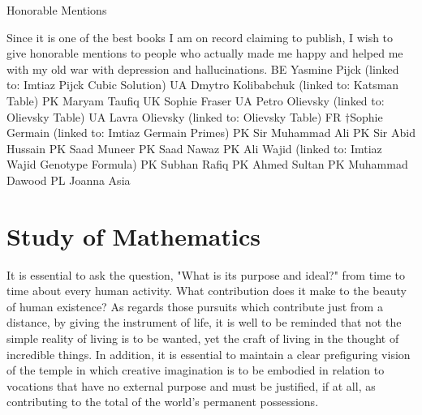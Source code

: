 \documentclass[a4paper,12pt]{book}[2004/02/16]
\providecommand{\hypertarget}[2]{#2}
\theoremstyle{ilemma}
\theoremstyle{itheorem}
\theoremstyle{iother}
\theoremstyle{icorollary}
\theoremstyle{numcorollary}
\theoremstyle{idefinition}
\begin{document}
\newpage
\Huge
\begin{center}
Honorable Mentions  
\end{center}
\normalsize
Since it is one of the best books I am on record claiming to publish, I wish to give honorable mentions to people who actually made me happy and helped me with my old war with depression and hallucinations.
\newline
\newline
BE Yasmine Pijck  (linked to: Imtiaz Pijck Cubic Solution)
\newline
UA Dmytro Kolibabchuk (linked to: Katsman Table)
\newline
PK Maryam Taufiq
\newline
UK Sophie Fraser
\newline
UA Petro Olievsky (linked to: Olievsky Table)
\newline
UA Lavra Olievsky (linked to: Olievsky Table)
\newline
FR $\dagger$Sophie Germain (linked to: Imtiaz Germain Primes)
\newline
PK Sir Muhammad Ali
\newline
PK Sir Abid Hussain
\newline
PK Saad Muneer
\newline
PK Saad Nawaz
\newline
PK Ali Wajid (linked to: Imtiaz Wajid Genotype Formula)
\newline
PK Subhan Rafiq
\newline
PK Ahmed Sultan
\newline
PK Muhammad Dawood
\newline
PL Joanna Asia

\tableofcontents
\mainmatter
\chapter{Study of Mathematics}\hypertarget{chapI}{}%
It is essential to ask the question, "What is its purpose and ideal?" from time to time about every human activity. What contribution does it make to the beauty of human existence? As regards those pursuits which contribute just from a distance,
by giving the instrument of life, it is well to be reminded that not
the simple reality of living is to be wanted, yet the craft of living in the
thought of incredible things. In addition, it is essential to maintain a clear prefiguring vision of the temple in which creative imagination is to be embodied in relation to vocations that have no external purpose and must be justified, if at all, as contributing to the total of the world's permanent possessions.
\end{document}
